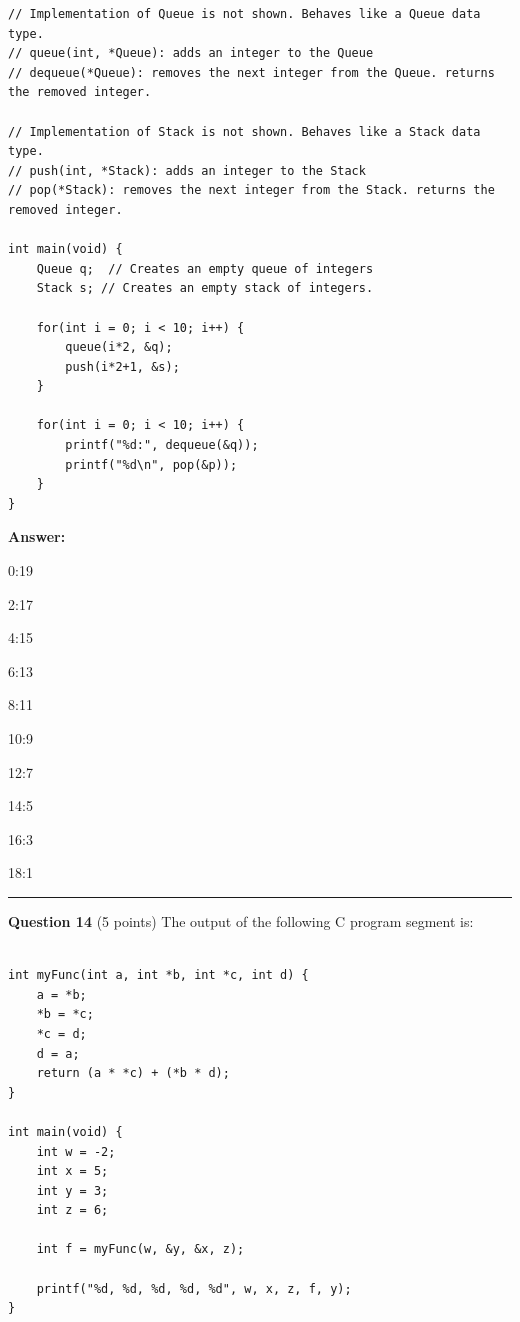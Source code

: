 \documentclass{exam}
\begin{document}
\begin{lstlisting}
// Implementation of Queue is not shown. Behaves like a Queue data type.
// queue(int, *Queue): adds an integer to the Queue
// dequeue(*Queue): removes the next integer from the Queue. returns the removed integer.

// Implementation of Stack is not shown. Behaves like a Stack data type.
// push(int, *Stack): adds an integer to the Stack
// pop(*Stack): removes the next integer from the Stack. returns the removed integer.

int main(void) {
    Queue q;  // Creates an empty queue of integers
    Stack s; // Creates an empty stack of integers.
    
    for(int i = 0; i < 10; i++) {
        queue(i*2, &q);
        push(i*2+1, &s); 
    }
 
    for(int i = 0; i < 10; i++) {
    	printf("%d:", dequeue(&q));
    	printf("%d\n", pop(&p));
    }
}
\end{lstlisting}

\textbf{Answer:}

0:19

2:17

4:15

6:13

8:11

10:9

12:7

14:5

16:3

18:1


\newpage




\begin{center}\noindent\rule{6in}{0.4pt}\end{center}

\textbf{Question 14} (5 points) The output of the following C program segment is:

\begin{lstlisting}

int myFunc(int a, int *b, int *c, int d) {
	a = *b;
	*b = *c;
	*c = d;
	d = a;
	return (a * *c) + (*b * d);
}

int main(void) {
	int w = -2;	
	int x = 5;
	int y = 3;
	int z = 6;
	
	int f = myFunc(w, &y, &x, z);
	
	printf("%d, %d, %d, %d, %d", w, x, z, f, y);
}

\end{lstlisting}
\end{document}
